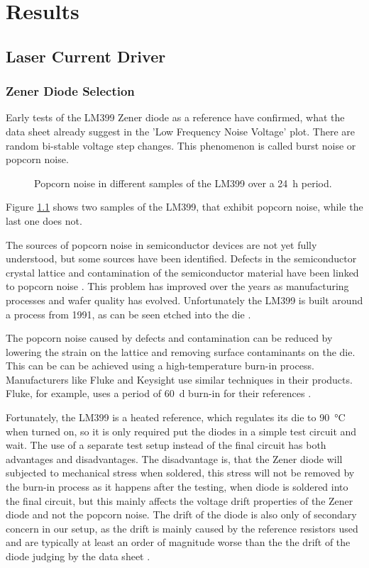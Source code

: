 \chapter{Results}
\section{Laser Current Driver}
\subsection{Zener Diode Selection}
Early tests of the LM399 Zener diode as a reference have confirmed, what the data sheet \cite{datasheet_LM399} already suggest in the 'Low Frequency Noise Voltage' plot. There are random bi-stable voltage step changes. This phenomenon is called burst noise or popcorn noise.

\begin{figure}[ht]
    \centering
    
    \caption{Popcorn noise in different samples of the LM399 over a \qty{24}{\hour} period.}
    \label{fig:popcorn_noise_lm399}
\end{figure}

Figure \ref{fig:popcorn_noise_lm399} shows two samples of the LM399, that exhibit popcorn noise, while the last one does not.

The sources of popcorn noise in semiconductor devices are not yet fully understood, but some sources have been identified. Defects in the semiconductor crystal lattice and contamination of the semiconductor material have been linked to popcorn noise \cite{technote_ti_popcorn_noise}. This problem has improved over the years as manufacturing processes and wafer quality has evolved. Unfortunately the LM399 is built around a process from 1991, as can be seen etched into the die \cite{lm399_richi}.

The popcorn noise caused by defects and contamination can be reduced by lowering the strain on the lattice and removing surface contaminants on the die. This can be can be achieved using a high-temperature burn-in process. Manufacturers like Fluke and Keysight use similar techniques in their products. Fluke, for example, uses a period of \qty{60}{\day} burn-in for their references \cite{zener_popcorn_noise}.

Fortunately, the LM399 is a heated reference, which regulates its die to \qty{90}{\celsius} when turned on, so it is only required put the diodes in a simple test circuit and wait. The use of a separate test setup instead of the final circuit has both advantages and disadvantages. The disadvantage is, that the Zener diode will subjected to mechanical stress when soldered, this stress will not be removed by the burn-in process as it happens after the testing, when diode is soldered into the final circuit, but this mainly affects the voltage drift properties of the Zener diode and not the popcorn noise. The drift of the diode is also only of secondary concern in our setup, as the drift is mainly caused by the reference resistors used and are typically at least an order of magnitude worse than the the drift of the diode judging by the data sheet \cite{datasheet_LM399,datasheet_VPR}.


